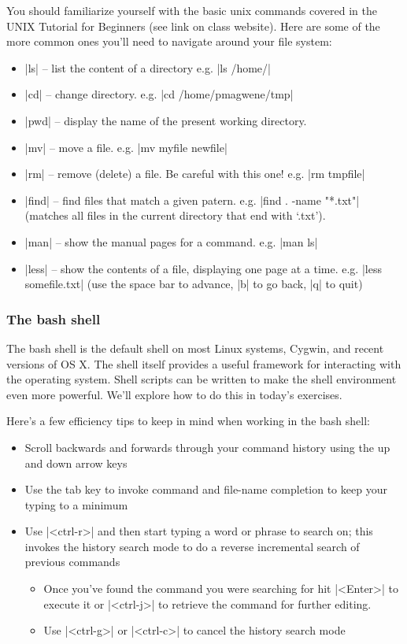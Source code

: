 You should familiarize yourself with the basic unix commands covered in the UNIX Tutorial for Beginners (see link on class website).  Here are some of the more common ones you'll need to navigate around your file system:

\begin{itemize}
\item |ls| -- list the content of a directory e.g. |ls /home/|
\item |cd| -- change directory.  e.g. |cd /home/pmagwene/tmp|
\item |pwd| -- display the name of the present working directory.
\item |mv| -- move a file. e.g. |mv myfile newfile|
\item |rm| -- remove (delete) a file. Be careful with this one! e.g. |rm tmpfile|
\item |find| -- find files that match a given patern. e.g. |find . -name "*.txt"| (matches all files in the current directory that end with `.txt').
\item |man| -- show the manual pages for a command. e.g. |man ls|
\item |less| -- show the contents of a file, displaying one page at a time. e.g. |less somefile.txt| (use the space bar to advance, |b| to go back, |q| to quit)
\end{itemize}


\subsubsection{The bash shell}

The bash shell is the default shell on most Linux systems, Cygwin, and recent versions of OS X.  The shell itself provides a useful framework for interacting with the operating system. Shell scripts can be written to make the shell environment even more powerful. We'll explore how to do this in today's exercises. 

Here's a few efficiency tips to keep in mind when working in the bash shell:
\begin{itemize}
    \item Scroll backwards and forwards through your command history using the up and down arrow keys
    \item Use the tab key to invoke command and file-name completion to keep your typing to a minimum
    \item Use |<ctrl-r>| and then start typing a word or phrase to search on; this invokes the history search mode to do a reverse incremental search of previous commands
    \begin{itemize}
        \item Once you've found the command you were searching for hit |<Enter>| to execute it or |<ctrl-j>| to retrieve the command for further editing.
        \item Use |<ctrl-g>| or |<ctrl-c>| to cancel the history search mode
    \end{itemize}
\end{itemize}


